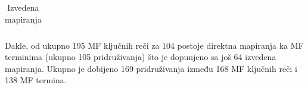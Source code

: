 \begin{table}[htpb]
\begin{tabular}{|p{6cm}|p{0.7cm}|p{0.5cm}|p{0.7cm}|p{8cm}|}

\end{tabular}
  \caption{Izvedena mapiranja}
  \label{tab:izvedeno_mapiranje}
\end{table}


Dakle, od ukupno 195 MF ključnih reči za 104 postoje direktna mapiranja ka MF
terminima (ukupno 105 pridruživanja) što je dopunjeno sa još  64 izvedena
mapiranja.  Ukupno je dobijeno 169 pridruživanja između 168 MF ključnih reči i
138 MF termina.



